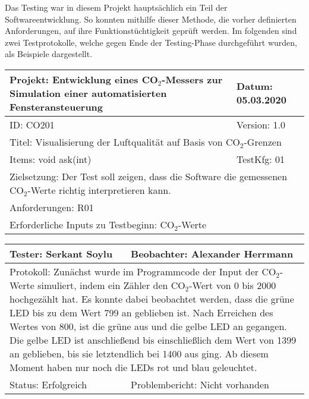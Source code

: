 \label{Testing}

Das Testing war in diesem Projekt hauptsächlich ein Teil der Softwareentwicklung. So konnten mithilfe dieser Methode, die vorher definierten Anforderungen, auf ihre Funktionstüchtigkeit geprüft werden. Im folgenden sind zwei Testprotokolle, welche gegen Ende der Testing-Phase durchgeführt wurden, als Beispiele dargestellt. \\

\begin{table}[!hbt]
	\centering
	\begin{tabular}{|p{8cm}|p{8cm}|}
		\hline
		Projekt: Entwicklung eines CO$_2$-Messers zur Simulation einer automatisierten Fensteransteuerung & Datum: 05.03.2020 \\
		\hline
		ID: CO201 & Version: 1.0 \\
		\hline
		\multicolumn{2}{|l|}{Titel: Visualisierung der Luftqualität auf Basis von CO$_2$-Grenzen} \\
		\hline
		Items: void ask(int) & TestKfg: 01 \\
		\hline
		\multicolumn{2}{|p{\textwidth-2\tabcolsep}|}{Zielsetzung: Der Test soll zeigen, dass die Software die gemessenen CO$_2$-Werte richtig interpretieren kann.} \\
		\hline
		\multicolumn{2}{|l|}{Anforderungen: R01} \\
		\hline
		\multicolumn{2}{|l|}{Erforderliche Inputs zu Testbeginn: CO$_2$-Werte} \\
		\hline
	\end{tabular}
\label{tab:Test_1}
\end{table}

\begin{table}[!hbt]
	\centering
	\begin{tabular}{|p{8cm}|p{8cm}|}
		\hline
		Tester: Serkant Soylu & Beobachter: Alexander Herrmann \\
		\hline
		\multicolumn{2}{|p{\textwidth-2\tabcolsep}|}{Protokoll: \newline Zunächst wurde im Programmcode der Input der CO$_2$-Werte simuliert, indem ein Zähler den CO$_2$-Wert von 0 bis 2000 hochgezählt hat. \newline Es konnte dabei beobachtet werden, dass die grüne \ac{LED} bis zu dem Wert 799 an geblieben ist. Nach Erreichen des Wertes von 800, ist die grüne aus und die gelbe \ac{LED} an gegangen. \newline Die gelbe \ac{LED} ist anschließend bis einschließlich dem Wert von 1399 an geblieben, bis sie letztendlich bei 1400 aus ging. Ab diesem Moment haben nur noch die \ac{LED}s rot und blau geleuchtet.} \\
		\hline
		Status: Erfolgreich & Problembericht: Nicht vorhanden \\
		\hline
	\end{tabular}
	\label{tab:Tester1}
\end{table}

